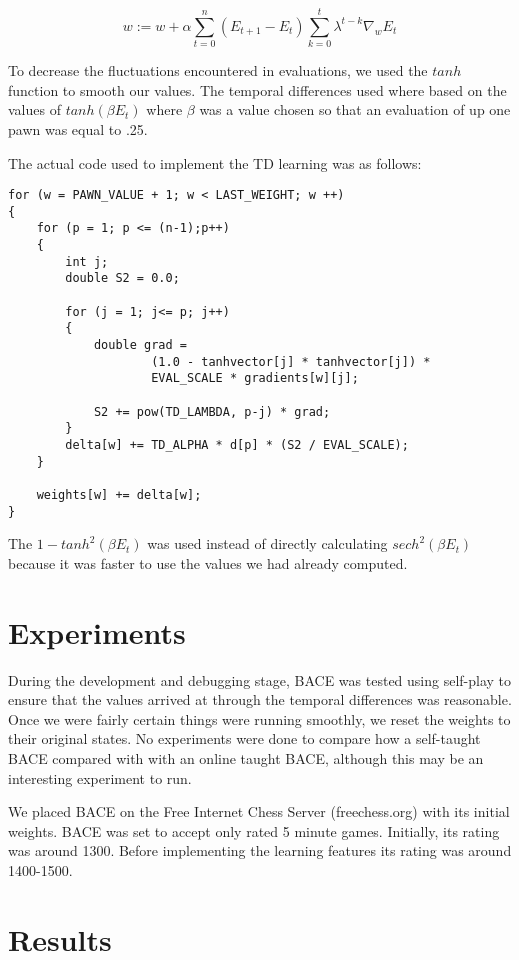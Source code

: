 \documentclass{article}
\begin{document}
\begin{equation}
w := w + \alpha \sum_{t=0}^n (E_{t+1} - E_t) \sum_{k=0}^t
\lambda^{t-k} \nabla_w E_t
\label{tdlambda}
\end{equation}


To decrease the fluctuations encountered in evaluations, we used the
$tanh$ function to smooth our values.  The temporal differences used
where based on the values of $tanh(\beta E_t)$ where $\beta$ was a value
chosen so that an evaluation of up one pawn was equal to .25.

The actual code used to implement the TD learning was as follows:
\begin{verbatim}
for (w = PAWN_VALUE + 1; w < LAST_WEIGHT; w ++)
{
    for (p = 1; p <= (n-1);p++)
    {
        int j;
        double S2 = 0.0;
        
        for (j = 1; j<= p; j++)
        {
            double grad =
                    (1.0 - tanhvector[j] * tanhvector[j]) *
                    EVAL_SCALE * gradients[w][j];
                    
            S2 += pow(TD_LAMBDA, p-j) * grad;
        }
        delta[w] += TD_ALPHA * d[p] * (S2 / EVAL_SCALE);
    }
        
    weights[w] += delta[w];
}   
\end{verbatim}
The $1 - tanh^2 (\beta E_t)$ was used instead of directly calculating
$sech^2 (\beta E_t)$
because it was faster to use the values we had already computed.

\section{Experiments}

During the development and debugging stage, BACE was tested using
self-play to ensure that the values arrived at through the temporal
differences was reasonable.  Once we were fairly certain things were
running smoothly, we reset the weights to their original states.  No
experiments were done to compare how a self-taught BACE compared with
with an online taught BACE, although this may be an interesting
experiment to run.  

We placed BACE on the Free Internet Chess Server (freechess.org) with
its initial weights.  BACE was set to accept only rated 5 minute
games.  Initially, its rating was around 1300.  Before implementing
the learning features its rating was around 1400-1500.

\section{Results}
\end{document}
